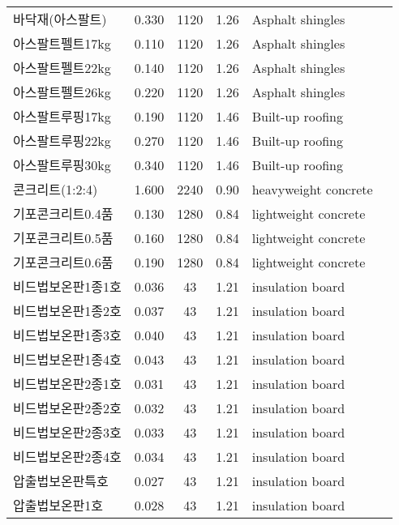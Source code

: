 \begin{longtable}{llcclc}
  바닥재(아스팔트) &   0.330 & 1120 & 1.26 & Asphalt shingles & \cite{ashrae_f18} \\
  아스팔트펠트17kg &   0.110 & 1120 & 1.26 & Asphalt shingles & \cite{ashrae_f18} \\
  아스팔트펠트22kg &   0.140 & 1120 & 1.26 & Asphalt shingles & \cite{ashrae_f18} \\
  아스팔트펠트26kg &   0.220 & 1120 & 1.26 & Asphalt shingles & \cite{ashrae_f18} \\
  아스팔트루핑17kg &   0.190 & 1120 & 1.46 & Built-up roofing & \cite{ashrae_f18} \\
  아스팔트루핑22kg &   0.270 & 1120 & 1.46 & Built-up roofing & \cite{ashrae_f18} \\
  아스팔트루핑30kg &   0.340 & 1120 & 1.46 & Built-up roofing & \cite{ashrae_f18} \\
  콘크리트(1:2:4) &   1.600 & 2240 & 0.90 & heavyweight concrete & \cite{ashrae_f18} \\
  기포콘크리트0.4품 &   0.130 & 1280 & 0.84 & lightweight concrete & \cite{ashrae_f18} \\
  기포콘크리트0.5품 &   0.160 & 1280 & 0.84 & lightweight concrete & \cite{ashrae_f18} \\
  기포콘크리트0.6품 &   0.190 & 1280 & 0.84 & lightweight concrete & \cite{ashrae_f18} \\
  비드법보온판1종1호 &   0.036 &   43 & 1.21 & insulation board & \cite{ashrae_f18} \\
  비드법보온판1종2호 &   0.037 &   43 & 1.21 & insulation board & \cite{ashrae_f18} \\
  비드법보온판1종3호 &   0.040 &   43 & 1.21 & insulation board & \cite{ashrae_f18} \\
  비드법보온판1종4호 &   0.043 &   43 & 1.21 & insulation board & \cite{ashrae_f18} \\
  비드법보온판2종1호 &   0.031 &   43 & 1.21 & insulation board & \cite{ashrae_f18} \\
  비드법보온판2종2호 &   0.032 &   43 & 1.21 & insulation board & \cite{ashrae_f18} \\
  비드법보온판2종3호 &   0.033 &   43 & 1.21 & insulation board & \cite{ashrae_f18} \\
  비드법보온판2종4호 &   0.034 &   43 & 1.21 & insulation board & \cite{ashrae_f18} \\
  압출법보온판특호 &   0.027 &   43 & 1.21 & insulation board & \cite{ashrae_f18} \\
  압출법보온판1호 &   0.028 &   43 & 1.21 & insulation board & \cite{ashrae_f18} \\

\end{longtable}

